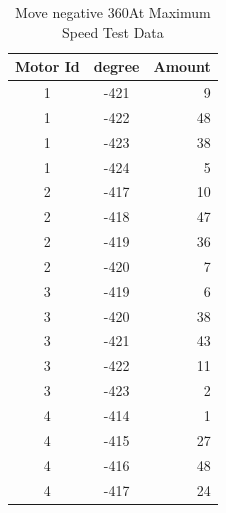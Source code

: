 \begin{table}
	\centering
	\begin{tabular}{| c | c | r | }
 	 \hline
	 Motor Id & degree & Amount \\ \hline
	 1 & -421 & 9 \\ \hline
	 1 & -422 & 48 \\ \hline
	 1 & -423 & 38 \\ \hline
	 1 & -424 & 5 \\ \hline
	 2 & -417 & 10 \\ \hline
	 2 & -418 & 47 \\ \hline
	 2 & -419 & 36 \\ \hline
	 2 & -420 & 7 \\ \hline
	 3 & -419 & 6 \\ \hline
	 3 & -420 & 38 \\ \hline
	 3 & -421 & 43 \\ \hline
	 3 & -422 & 11 \\ \hline
	 3 & -423 & 2 \\ \hline
	 4 & -414 & 1 \\ \hline
	 4 & -415 & 27 \\ \hline
	 4 & -416 & 48 \\ \hline
	 4 & -417 & 24 \\ \hline
	\end{tabular}
	\caption{Move negative 360\textdegree At Maximum Speed Test Data}
	\label{tbl:cmpl_negative_test_data}
\end{table}

